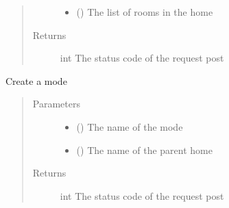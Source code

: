 \documentclass[letterpaper,10pt,english]{sphinxmanual}
\begin{document}
\begin{fulllineitems}
\begin{fulllineitems}
\begin{quote}
\begin{description}
\begin{itemize}
\item {} 
\sphinxAtStartPar
{} () \textendash{} The list of rooms in the home

\end{itemize}

\item[{Returns}] \leavevmode
\sphinxAtStartPar
int \textendash{} The status code of the request post

\end{description}\end{quote}

\end{fulllineitems}


\begin{fulllineitems}
\label{\detokenize{index:Api.Api.create_mode}}
\sphinxAtStartPar
Create a mode
\begin{quote}\begin{description}
\item[{Parameters}] \leavevmode\begin{itemize}
\item {} 
\sphinxAtStartPar
{} () \textendash{} The name of the mode

\item {} 
\sphinxAtStartPar
{} () \textendash{} The name of the parent home

\end{itemize}

\item[{Returns}] \leavevmode
\sphinxAtStartPar
int \textendash{} The status code of the request post

\end{description}\end{quote}

\end{fulllineitems}


\end{fulllineitems}
\end{document}
